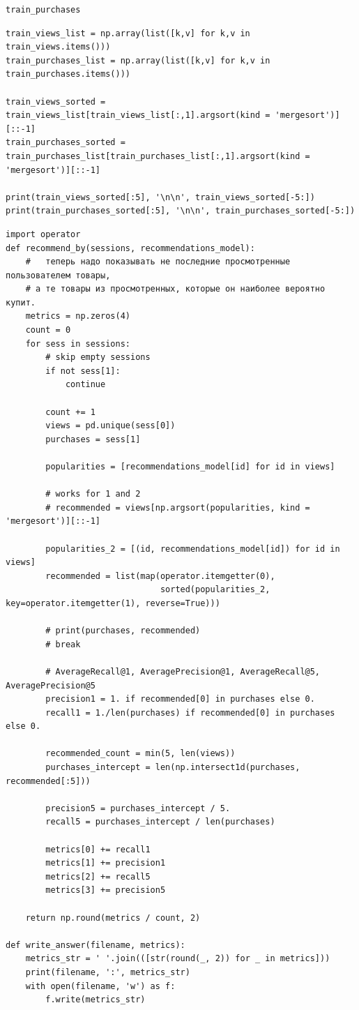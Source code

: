 \documentclass[11pt,a4paper]{article}
\begin{document}
\begin{verbatim}
train_purchases
\end{verbatim}

\begin{verbatim}
train_views_list = np.array(list([k,v] for k,v in train_views.items()))
train_purchases_list = np.array(list([k,v] for k,v in train_purchases.items()))

train_views_sorted = train_views_list[train_views_list[:,1].argsort(kind = 'mergesort')][::-1]
train_purchases_sorted = train_purchases_list[train_purchases_list[:,1].argsort(kind = 'mergesort')][::-1]

print(train_views_sorted[:5], '\n\n', train_views_sorted[-5:])
print(train_purchases_sorted[:5], '\n\n', train_purchases_sorted[-5:])
\end{verbatim}

\begin{verbatim}
import operator
def recommend_by(sessions, recommendations_model):
    #   теперь надо показывать не последние просмотренные пользователем товары, 
    # а те товары из просмотренных, которые он наиболее вероятно купит.
    metrics = np.zeros(4) 
    count = 0
    for sess in sessions:
        # skip empty sessions
        if not sess[1]:
            continue

        count += 1
        views = pd.unique(sess[0])
        purchases = sess[1]
        
        popularities = [recommendations_model[id] for id in views]
        
        # works for 1 and 2
        # recommended = views[np.argsort(popularities, kind = 'mergesort')][::-1]
        
        popularities_2 = [(id, recommendations_model[id]) for id in views]
        recommended = list(map(operator.itemgetter(0), 
                               sorted(popularities_2, key=operator.itemgetter(1), reverse=True)))
        
        # print(purchases, recommended)
        # break
        
        # AverageRecall@1, AveragePrecision@1, AverageRecall@5, AveragePrecision@5
        precision1 = 1. if recommended[0] in purchases else 0.
        recall1 = 1./len(purchases) if recommended[0] in purchases else 0.
        
        recommended_count = min(5, len(views))
        purchases_intercept = len(np.intersect1d(purchases, recommended[:5]))
        
        precision5 = purchases_intercept / 5.
        recall5 = purchases_intercept / len(purchases)
                
        metrics[0] += recall1
        metrics[1] += precision1
        metrics[2] += recall5
        metrics[3] += precision5
        
    return np.round(metrics / count, 2)

def write_answer(filename, metrics):
    metrics_str = ' '.join(([str(round(_, 2)) for _ in metrics]))
    print(filename, ':', metrics_str)
    with open(filename, 'w') as f:
        f.write(metrics_str)
\end{verbatim}
\end{document}

